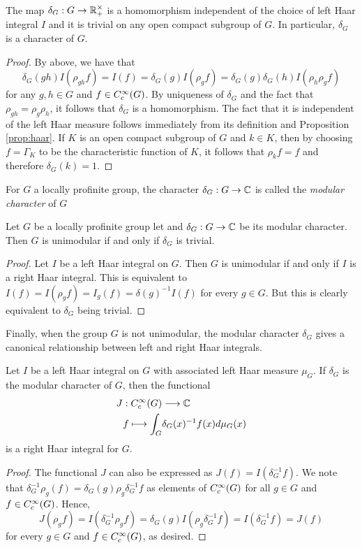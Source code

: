 \begin{lemma}
    The map $\delta_G:G\to\mathbb{R}_+^{\times}$ is a homomorphism independent of the choice of left Haar integral $I$ and it is trivial on any open compact subgroup of $G$. In particular, $\delta_G$ is a character of $G$.
\end{lemma}
\begin{proof}
    By above, we have that 
    $$\delta_G(gh)I(\rho_{gh}f)=I(f)=\delta_G(g)I(\rho_g f)=\delta_G(g)\delta_G(h)I(\rho_h\rho_g f)$$
    for any $g,h\in G$ and $f\in C_c^{\infty}(G)$.
    By uniqueness of $\delta_G$ and the fact that $\rho_{gh}=\rho_g\rho_h$, it follows that $\delta_G$ is a homomorphism. The fact that it is independent of the left Haar measure follows immediately from its definition and Proposition \ref{prop:haar}. 
    If $K$ is an open compact subgroup of $G$ and $k\in K$, then by choosing $f=\Gamma_K$ to be the characteristic function of $K$, it follows that $\rho_k f= f$ and therefore $\delta_G(k)=1$.
\end{proof}

\begin{defn}
    For $G$ a locally profinite group, the character $\delta_G:G\to\mathbb{C}$ is called the \textit{modular character} of $G$
\end{defn}


\begin{lemma}
    Let $G$ be a locally profinite group let and $\delta_G:G\to\mathbb{C}$ be its modular character. Then $G$ is unimodular if and only if $\delta_G$ is trivial. 
\end{lemma}
\begin{proof}
    Let $I$ be a left Haar integral on $G$. Then $G$ is unimodular if and only if $I$ is a right Haar integral. This is equivalent to $I(f)=I(\rho_g f)=I_g(f)=\delta(g)^{-1}I(f)$ for every $g\in G$. But this is clearly equivalent to $\delta_G$ being trivial. 
\end{proof}

Finally, when the group $G$ is not unimodular, the modular character $\delta_G$ gives a canonical relationship between left and right Haar integrals.

\begin{lemma}
    Let $I$ be a left Haar integral on $G$ with associated left Haar measure $\mu_G$. If $\delta_G$ is the modular character of $G$, then the functional
    \begin{align*}
        J:C_c^{\infty}(G)&\longrightarrow\mathbb{C}\\
        f\longmapsto\int_G& \delta_G(x)^{-1}f(x)d\mu_G(x)
    \end{align*}
    is a right Haar integral for $G$.
\end{lemma}
\begin{proof}
    The functional $J$ can also be expressed as $J(f)=I(\delta_G^{-1}f)$. We note that $\delta_G^{-1}\rho_g(f)=\delta_G(g)\rho_g\delta_G^{-1}f$ as elements of $C_c^{\infty}(G)$ for all $g\in G$ and $f\in C_c^{\infty}(G)$.  Hence, 
    $$J(\rho_g f)=I(\delta_G^{-1}\rho_g f)=\delta_G(g)I(\rho_g\delta_G^{-1}f)=I(\delta^{-1}_G f)=J(f)$$
    for every $g\in G$ and $f\in C_c^{\infty}(G)$, as desired.
\end{proof}



